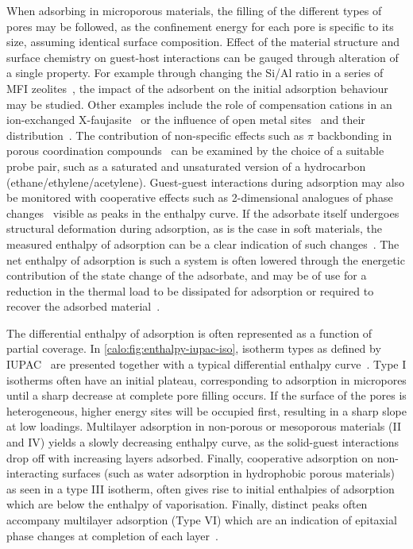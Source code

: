 When adsorbing in microporous materials, the filling of the
different types of pores may be followed, as the confinement
energy for each pore is specific to its size, assuming identical
surface composition.
Effect of the material structure and surface chemistry
on guest-host interactions can be gauged through alteration of
a single property. For example through changing the Si/Al ratio
in a series of MFI zeolites~\cite{llewellynAdsorptionMFItypeZeolites1993},
the impact of the adsorbent on the initial adsorption behaviour
may be studied.
Other examples include the role of compensation cations in an
ion-exchanged X-faujasite~\cite{maurinAdsorptionArgonNitrogen2005, %
	maurinInfluenceExtraFrameworkCations2005}
or the influence of open metal sites~\cite{grajciarUnderstandingCOAdsorption2011}
and their distribution~\cite{yoonControlledReducibilityMetalOrganic2010}.
The contribution of non-specific effects such as \( \pi \)
backbonding in porous coordination compounds~\cite{rubesAdsorptionPropanePropylene2013}
can be examined by the choice of a suitable probe pair, such as a saturated
and unsaturated version of a hydrocarbon (ethane/ethylene/acetylene).
Guest-guest interactions during adsorption may also be monitored
with cooperative effects such as 2-dimensional analogues of phase
changes~\cite{rouquerolCalorimetricEvidenceBidimensional1977}
visible as peaks in the enthalpy curve.
If the adsorbate itself undergoes structural deformation during adsorption,
as is the case in soft materials, the measured enthalpy of
adsorption can be a clear indication of such
changes~\cite{bourrellyDifferentAdsorptionBehaviors2005}.
The net enthalpy of adsorption is such a system is often
lowered through the energetic contribution of the state
change of the adsorbate, and may be of use for a reduction in
the thermal load to be dissipated for adsorption or required to
recover the adsorbed material~\cite{masonMethaneStorageFlexible2015}.

The differential enthalpy of adsorption is often represented as a
function of partial coverage. In \autoref{calo:fig:enthalpy-iupac-iso},
isotherm types as defined by \gls{IUPAC}~\cite{thommesPhysisorptionGasesSpecial2015}
are presented together with a typical differential enthalpy
curve~\cite{llewellynGasAdsorptionMicrocalorimetry2005}. Type I isotherms often
have an initial plateau, corresponding to adsorption in micropores
until a sharp decrease at complete pore filling occurs. If the surface
of the pores is heterogeneous, higher energy sites will be occupied
first, resulting in a sharp slope at low loadings. Multilayer
adsorption in non-porous or mesoporous materials (II and IV) yields
a slowly decreasing enthalpy curve, as the solid-guest interactions
drop off with increasing layers adsorbed. Finally, cooperative adsorption
on non-interacting surfaces (such as water adsorption in hydrophobic porous
materials) as seen in a type III isotherm, often gives rise to initial enthalpies
of adsorption which are below the enthalpy of vaporisation.
Finally, distinct peaks often accompany multilayer adsorption (Type VI)
which are an indication of epitaxial phase
changes at completion of each layer~\cite{llewellynAdsorptionMFItypeZeolites1993, %
	llewellynAdsorptionMFItypeZeolites1993a, %
	rouquerolCalorimetricEvidenceBidimensional1977}.


